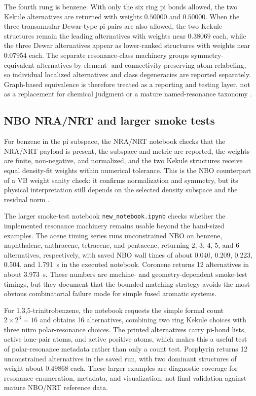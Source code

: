 \documentclass[11pt]{article}
\begin{document}
The fourth rung is benzene.  With only the six ring pi bonds allowed, the two Kekule alternatives are returned with weights $0.50000$ and $0.50000$.  When the three transannular Dewar-type pi pairs are also allowed, the two Kekule structures remain the leading alternatives with weights near $0.38069$ each, while the three Dewar alternatives appear as lower-ranked structures with weights near $0.07954$ each.  The separate resonance-class machinery groups symmetry-equivalent alternatives by element- and connectivity-preserving atom relabeling, so individual localized alternatives and class degeneracies are reported separately.  Graph-based equivalence is therefore treated as a reporting and testing layer, not as a replacement for chemical judgment or a mature named-resonance taxonomy \cite{GraphAutomorphism,ChemicalGraphTheory}.

\subsection{NBO NRA/NRT and larger smoke tests}

For benzene in the pi subspace, the NRA/NRT notebook checks that the NRA/NRT payload is present, the subspace and metric are reported, the weights are finite, non-negative, and normalized, and the two Kekule structures receive equal density-fit weights within numerical tolerance.  This is the NBO counterpart of a VB weight sanity check: it confirms normalization and symmetry, but its physical interpretation still depends on the selected density subspace and the residual norm \cite{GlendeningWeinholdNRT}.

The larger smoke-test notebook \texttt{new\_notebook.ipynb} checks whether the implemented resonance machinery remains usable beyond the hand-sized examples.  The acene timing series runs unconstrained NBO on benzene, naphthalene, anthracene, tetracene, and pentacene, returning 2, 3, 4, 5, and 6 alternatives, respectively, with saved NBO wall times of about 0.040, 0.209, 0.223, 0.504, and 1.791~s in the executed notebook.  Coronene returns 12 alternatives in about 3.973~s.  These numbers are machine- and geometry-dependent smoke-test timings, but they document that the bounded matching strategy avoids the most obvious combinatorial failure mode for simple fused aromatic systems.

For 1,3,5-trinitrobenzene, the notebook requests the simple formal count $2\times2^3=16$ and obtains 16 alternatives, combining two ring Kekule choices with three nitro polar-resonance choices.  The printed alternatives carry pi-bond lists, active lone-pair atoms, and active positive atoms, which makes this a useful test of polar-resonance metadata rather than only a count test.  Porphyrin returns 12 unconstrained alternatives in the saved run, with two dominant structures of weight about $0.49868$ each.  These larger examples are diagnostic coverage for resonance enumeration, metadata, and visualization, not final validation against mature NBO/NRT reference data.
\end{document}
